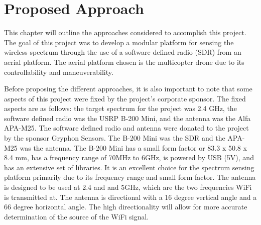\chapter{Proposed Approach}
This chapter will outline the approaches considered to accomplish this project. The goal of this project was to develop a modular platform for sensing the wireless spectrum through the use of a software defined radio (SDR) from an aerial platform. The aerial platform chosen is the multicopter drone due to its controllability and maneuverability. \par

Before proposing the different approaches, it is also important to note that some aspects of this project were fixed by the project’s corporate sponsor. The fixed aspects are as follows: the target spectrum for the project was 2.4 GHz, the software defined radio was the USRP B-200 Mini, and the antenna was the Alfa APA-M25. The software defined radio and antenna were donated to the project by the sponsor Gryphon Sensors. The B-200 Mini was the SDR and the APA-M25 was the antenna. The B-200 Mini has a small form factor or 83.3 x 50.8 x 8.4 mm, has a frequency range of 70MHz to 6GHz, is powered by USB (5V), and has an extensive set of libraries. It is an excellent choice for the spectrum sensing platform primarily due to its frequency range and small form factor. The antenna is designed to be used at 2.4 and and 5GHz, which are the two frequencies WiFi is transmitted at. The antenna is directional with a 16 degree vertical angle and a 66 degree horizontal angle. The high directionality will allow for more accurate determination of the source of the WiFi signal.



